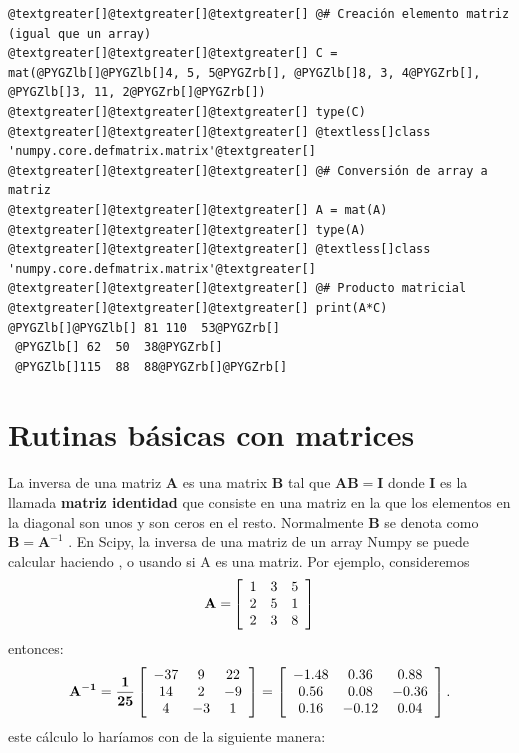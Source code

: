 \documentclass[letterpaper,10pt,spanish]{sphinxmanual}
\begin{document}
\begin{Verbatim}[commandchars=@\[\]]
@textgreater[]@textgreater[]@textgreater[] @# Creación elemento matriz (igual que un array)
@textgreater[]@textgreater[]@textgreater[] C = mat(@PYGZlb[]@PYGZlb[]4, 5, 5@PYGZrb[], @PYGZlb[]8, 3, 4@PYGZrb[], @PYGZlb[]3, 11, 2@PYGZrb[]@PYGZrb[])
@textgreater[]@textgreater[]@textgreater[] type(C)
@textgreater[]@textgreater[]@textgreater[] @textless[]class 'numpy.core.defmatrix.matrix'@textgreater[]
@textgreater[]@textgreater[]@textgreater[] @# Conversión de array a matriz
@textgreater[]@textgreater[]@textgreater[] A = mat(A)
@textgreater[]@textgreater[]@textgreater[] type(A)
@textgreater[]@textgreater[]@textgreater[] @textless[]class 'numpy.core.defmatrix.matrix'@textgreater[]
@textgreater[]@textgreater[]@textgreater[] @# Producto matricial
@textgreater[]@textgreater[]@textgreater[] print(A*C)
@PYGZlb[]@PYGZlb[] 81 110  53@PYGZrb[]
 @PYGZlb[] 62  50  38@PYGZrb[]
 @PYGZlb[]115  88  88@PYGZrb[]@PYGZrb[]
\end{Verbatim}


\section{Rutinas básicas con matrices}
\label{calculo_numerico:rutinas-basicas-con-matrices}
La inversa de una matriz $\mathbf{A}$ es una matrix  $\mathbf{B}$ tal que $\mathbf{AB}=\mathbf{I}$ donde  $\mathbf{I}$ es la llamada \textbf{matriz identidad} que consiste en una matriz en la que los elementos en la diagonal son unos y son ceros en el resto. Normalmente  $\mathbf{B}$ se denota como $\mathbf{B}=\mathbf{A}^{-1}$ . En Scipy, la inversa de una matriz de un array Numpy se puede calcular haciendo , o usando  si A es una matriz. Por ejemplo, consideremos
\begin{gather}
\begin{split}\mathbf{A=}
\left[
        \begin{array}{ccc}
                1 & 3 & 5\\
                2 & 5 & 1\\
                2 & 3 & 8
        \end{array}
\right]\end{split}\notag
\end{gather}
entonces:
\begin{gather}
\begin{split}\mathbf{A^{-1}=\frac{1}{25}\left[\begin{array}{ccc} -37 & 9 & 22\\ 14 & 2 & -9\\ 4 & -3 & 1\end{array}\right]=\left[\begin{array}{ccc} -1.48 & 0.36 & 0.88\\ 0.56 & 0.08 & -0.36\\ 0.16 & -0.12 & 0.04\end{array}\right].}\end{split}\notag
\end{gather}
este cálculo lo haríamos con  de la siguiente manera:
\end{document}
